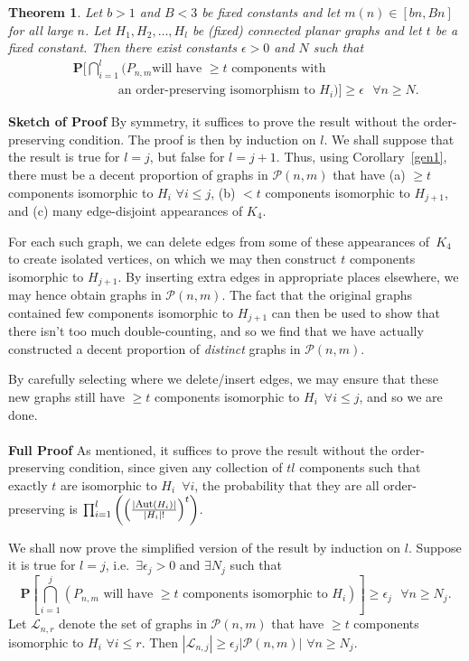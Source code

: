 \documentclass{article}
\newtheorem{Theorem}{Theorem}
\newtheorem{Proof of Theorem}{Proof of Theorem}
\begin{document}
\begin{Theorem} \label{gen3}
Let $b>1$ and $B<3$ be fixed constants and let $m(n) \in [bn,Bn]$ for all large $n$.
Let $H_{1},H_{2}, \ldots, H_{l}$ 
be (fixed) connected planar graphs and let $t$ be a fixed constant.
Then there exist constants $\epsilon > 0$ and $N$ such that
\begin{eqnarray*}
& & \mathbf{P} 
\Big[ \bigcap_{i=1}^{l} 
(
\textrm{$P_{n,m}$
will have $\geq t$ components with} \\
& & \phantom{wwwww}\textrm{an order-preserving isomorphism to $H_{i}$} ) ] 
\geq \epsilon \textrm{ } \forall n \geq N.  
\end{eqnarray*} 
\end{Theorem}
\textbf{Sketch of Proof}
By symmetry,
it suffices to prove the result without the order-preserving condition.
The proof is then by induction on $l$.
We shall suppose that the result is true for $l=j$, but false for $l=j+1$.
Thus, using Corollary~\ref{gen1},
there must be a decent proportion of graphs in $\mathcal{P}(n,m)$ that have
(a) $\geq t$ components isomorphic to $H_{i}$ $\forall i \leq j$, 
(b) $<t$ components isomorphic to $H_{j+1}$,
and (c) many edge-disjoint appearances of $K_{4}$.

For each such graph, 
we can delete edges from some of these appearances of~$K_{4}$ to create isolated vertices,
on which we may then construct $t$ components isomorphic to $H_{j+1}$.
By inserting extra edges in appropriate places elsewhere,
we may hence obtain graphs in $\mathcal{P}(n,m)$.
The fact that the original graphs contained 
few components isomorphic to $H_{j+1}$
can then be used to show that there isn't too much double-counting,
and so we find that we have actually constructed a decent proportion of \textit{distinct} graphs in $\mathcal{P}(n,m)$.

By carefully selecting where we delete/insert edges,
we may ensure that these new graphs still have $\geq t$ components 
isomorphic to $H_{i}$~$\forall i \leq j$,
and so we are done. \\
\\
\textbf{Full Proof} 
As mentioned, 
it suffices to prove the result without the order-preserving condition,
since given any collection of $tl$ components such that exactly $t$ are isomorphic to $H_{i}$~$\forall i$,
the probability that they are all order-preserving is
$\prod_{i=1}^{l} \left( \left( \frac{| \textrm{\footnotesize{Aut}}(H_{i}) |}{|H_{i}|!} \right)^{t} \right)$.

We shall now prove the simplified version of the result by induction on $l$.
Suppose it is true for $l=j$,
i.e.~$\exists \epsilon_{j} >0$ and $\exists N_{j}$ such that
\begin{displaymath}
\mathbf{P}
\left[ \bigcap_{i=1}^{j} 
\left(P_{n,m} \textrm{ will have $\geq t$ components isomorphic to } H_{i} \right) \right]
\geq \epsilon_{j} \textrm{ } \forall n \geq N_{j}.
\end{displaymath} 
Let $\mathcal{L}_{n,r}$ denote the set of graphs in $\mathcal{P}(n,m)$ that have $\geq t$ components
isomorphic to $H_{i}$ $\forall i \leq r$.
Then $|\mathcal{L}_{n,j}| \geq \epsilon_{j} |\mathcal{P}(n,m)|$ $\forall n \geq N_{j}$. 
\end{document}
